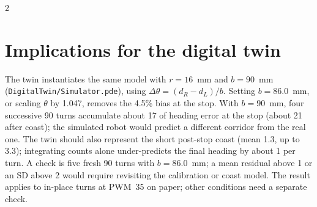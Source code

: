 \documentclass[a4paper,10pt]{article}
\begin{document}
\begin{multicols*}{2}
\section*{Implications for the digital twin}
The twin instantiates the same model with $r=16$~mm and $b=90$~mm
(\texttt{DigitalTwin/Simulator.pde}), using $\Delta\theta=(d_R-d_L)/b$. Setting $b=86.0$~mm, or scaling $\theta$ by
1.047, removes the 4.5\% bias at the stop. With $b=90$~mm, four successive
90\textdegree{} turns accumulate about 17\textdegree{} of heading error at the
stop (about 21\textdegree{} after coast); the simulated robot would predict a
different corridor from the real one. The twin should also represent the short post-stop coast (mean 1.3\textdegree{}, up to
3.3\textdegree{}); integrating counts alone under-predicts the final heading
by about 1\textdegree{} per turn. A check is five fresh 90\textdegree{} turns
with $b=86.0$~mm; a mean residual above 1\textdegree{} or an SD above
2\textdegree{} would require revisiting the calibration or coast model. The
result applies to in-place turns at PWM~35 on paper; other conditions need a
separate check.


\end{multicols*}
\end{document}
